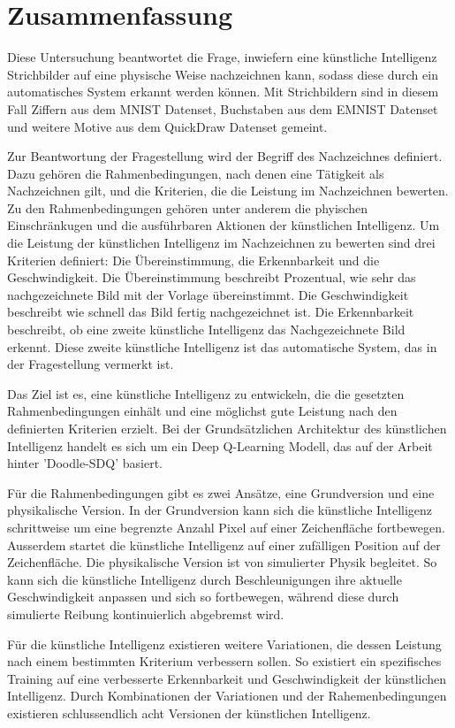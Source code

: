 \chapter{Zusammenfassung}
Diese Untersuchung beantwortet die Frage, inwiefern eine künstliche Intelligenz
Strichbilder auf eine physische Weise nachzeichnen kann, sodass diese durch ein
automatisches System erkannt werden können. Mit Strichbildern sind in diesem
Fall Ziffern aus dem MNIST Datenset, Buchstaben aus dem EMNIST Datenset und
weitere Motive aus dem QuickDraw Datenset gemeint. 

Zur Beantwortung der Fragestellung wird der Begriff des Nachzeichnes definiert.
Dazu gehören die Rahmenbedingungen, nach denen eine Tätigkeit als Nachzeichnen
gilt, und die Kriterien, die die Leistung im Nachzeichnen bewerten. Zu den
Rahmenbedingungen gehören unter anderem die phyischen Einschränkugen und die
ausführbaren Aktionen der künstlichen Intelligenz. Um die Leistung der
künstlichen Intelligenz im Nachzeichnen zu bewerten sind drei Kriterien
definiert: Die Übereinstimmung, die Erkennbarkeit und die Geschwindigkeit. Die
Übereinstimmung beschreibt Prozentual, wie sehr das nachgezeichnete Bild mit der
Vorlage übereinstimmt. Die Geschwindigkeit beschreibt wie schnell das Bild
fertig nachgezeichnet ist. Die Erkennbarkeit beschreibt, ob eine zweite
künstliche Intelligenz das Nachgezeichnete Bild erkennt. Diese zweite künstliche
Intelligenz ist das automatische System, das in der Fragestellung vermerkt ist.

Das Ziel ist es, eine künstliche Intelligenz zu entwickeln, die die gesetzten
Rahmenbedingungen einhält und eine möglichst gute Leistung nach den definierten
Kriterien erzielt. Bei der Grundsätzlichen Architektur des künstlichen
Intelligenz handelt es sich um ein Deep Q-Learning Modell, das auf der Arbeit
hinter 'Doodle-SDQ' basiert.

Für die Rahmenbedingungen gibt es zwei Ansätze, eine Grundversion und eine
physikalische Version. In der Grundversion kann sich die künstliche Intelligenz
schrittweise um eine begrenzte Anzahl Pixel auf einer Zeichenfläche fortbewegen.
Ausserdem startet die künstliche Intelligenz auf einer zufälligen Position auf
der Zeichenfläche. Die physikalische Version ist von simulierter Physik
begleitet. So kann sich die künstliche Intelligenz durch Beschleunigungen ihre
aktuelle Geschwindigkeit anpassen und sich so fortbewegen, während diese durch
simulierte Reibung kontinuierlich abgebremst wird. 

Für die künstliche Intelligenz existieren weitere Variationen, die dessen
Leistung nach einem bestimmten Kriterium verbessern sollen. So existiert ein
spezifisches Training auf eine verbesserte Erkennbarkeit und Geschwindigkeit der
künstlichen Intelligenz. Durch Kombinationen der Variationen und der
Rahemenbedingungen existieren schlussendlich acht Versionen der künstlichen
Intelligenz.

